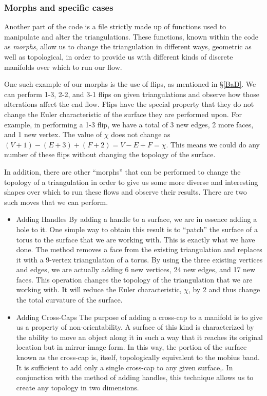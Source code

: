 \documentclass[12pt]{article}
\begin{document}
\subsubsection{Morphs and specific cases}

Another part of the code is a file strictly made up of functions used to manipulate and alter the triangulations. These functions, known within the code as \textit{morphs}, allow us to change the triangulation in different ways, geometric as well as topological, in order to provide us with different kinds of discrete manifolds over which to run our flow.

 One such example of our morphs is the use of flips, as mentioned in \S\ref{BaD}. We can perform 1-3, 2-2, and 3-1 flips on given triangulations and observe how those alterations affect the end flow. Flips have the special property that they do not change the Euler characteristic of the surface they are performed upon. For example, in performing a 1-3 flip, we have a total of 3 new edges, 2 more faces, and 1 new vertex. The value of $\chi$ does not change as $(V+1) - (E+3) + (F+2) = V - E + F = \chi$. This means we could do any number of these flips without changing the topology of the surface.

 In addition, there are other ``morphs'' that can be performed to change the topology of a triangulation in order to give us some more diverse and interesting shapes over which to run these flows and observe their results. There are two such moves that we can perform.

\begin{itemize}
\item Adding Handles 
By adding a handle to a surface, we are in essence adding a hole to it. One simple way to obtain this result is to ``patch'' the surface of a torus to the surface that we are working with. This is exactly what we have done. The method removes a face from the existing triangulation and replaces it with a 9-vertex triangulation of a torus. By using the three existing vertices and edges, we are actually adding 6 new vertices, 24 new edges, and 17 new faces. This operation changes the topology of the triangulation that we are working with. It will reduce the Euler characteristic, $\chi$, by 2 and thus change the total curvature of the surface.
\item Adding Cross-Caps 
The purpose of adding a cross-cap to a manifold is to give us a property of non-orientability. A surface of this kind is characterized by the ability to move an object along it in such a way that it reaches its original location but in mirror-image form. In this way, the portion of the surface known as the cross-cap is, itself, topologically equivalent to the mobius band. It is sufficient to add only a single cross-cap to any given surface,. In conjunction with the method of adding handles, this technique allows us to create any topology in two dimensions.
\end{itemize}
\end{document}
